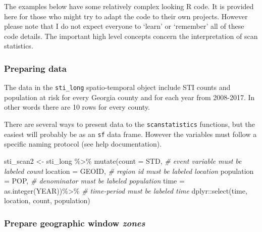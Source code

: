 \documentclass[
]{book}
\newenvironment{Shaded}{\begin{snugshade}}{\end{snugshade}}
\newcommand{\AttributeTok}[1]{\textcolor[rgb]{0.77,0.63,0.00}{#1}}
\newcommand{\CommentTok}[1]{\textcolor[rgb]{0.56,0.35,0.01}{\textit{#1}}}
\newcommand{\FunctionTok}[1]{\textcolor[rgb]{0.00,0.00,0.00}{#1}}
\newcommand{\NormalTok}[1]{#1}
\newcommand{\OtherTok}[1]{\textcolor[rgb]{0.56,0.35,0.01}{#1}}
\newcommand{\SpecialCharTok}[1]{\textcolor[rgb]{0.00,0.00,0.00}{#1}}
\newenvironment{rmdcaution}[1]
  {
  \begin{itemize}
  \renewcommand{\labelitemi}{
    \raisebox{-.7\height}[0pt][0pt]{
      {\setkeys{Gin}{width=3em,keepaspectratio}\texttt{[image: images/\#1]}}
    }
  }
  \setlength{\fboxsep}{1em}
  \begin{caution}
  \item
  }
  {
  \end{caution}
  \end{itemize}
  }
\begin{document}
\begin{rmdcaution}{caution}
The examples below have some relatively complex looking R code. It is provided here for those who might try to adapt the code to their own projects. However please note that I do not expect everyone to `learn' or `remember' all of these code details. The important high level concepts concern the interpretation of scan statistics.

\end{rmdcaution}

\hypertarget{preparing-data}{%
\subsubsection{Preparing data}\label{preparing-data}}

The data in the \texttt{sti\_long} spatio-temporal object include STI counts and population at risk for every Georgia county and for each year from 2008-2017. In other words there are 10 rows for every county.

There are several ways to present data to the \texttt{scanstatistics} functions, but the easiest will probably be as an \texttt{sf} data frame. However the variables must follow a specific naming protocol (see help documentation).

\begin{Shaded}
\begin{Highlighting}[]
\NormalTok{sti\_scan2 }\OtherTok{\textless{}{-}}\NormalTok{ sti\_long }\SpecialCharTok{\%\textgreater{}\%}
  \FunctionTok{mutate}\NormalTok{(}\AttributeTok{count =}\NormalTok{ STD,       }\CommentTok{\# event variable must be labeled \textquotesingle{}count\textquotesingle{}}
         \AttributeTok{location =}\NormalTok{ GEOID, }\CommentTok{\# region id must be labeled \textquotesingle{}location\textquotesingle{}}
         \AttributeTok{population =}\NormalTok{ POP, }\CommentTok{\# denominator must be labeled \textquotesingle{}population}
         \AttributeTok{time =} \FunctionTok{as.integer}\NormalTok{(YEAR))}\SpecialCharTok{\%\textgreater{}\%}  \CommentTok{\# time{-}period must be labeled \textquotesingle{}time\textquotesingle{}}
\NormalTok{  dplyr}\SpecialCharTok{::}\FunctionTok{select}\NormalTok{(time, location, count, population) }
\end{Highlighting}
\end{Shaded}

\hypertarget{prepare-geographic-window-zones}{%
\subsubsection{\texorpdfstring{Prepare geographic window \emph{zones}}{Prepare geographic window zones}}\label{prepare-geographic-window-zones}}
\end{document}
